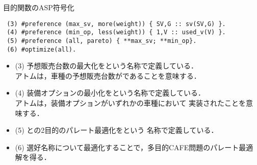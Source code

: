 \documentclass[dvipdfmx, 11pt]{beamer}
\begin{document}
\begin{frame}[fragile]{目的関数のASP符号化}
\begin{exampleblock}{}\small
\begin{lstlisting}
 (3) #preference (max_sv, more(weight)) { SV,G :: sv(SV,G) }.
 (4) #preference (min_op, less(weight)) { 1,V :: used_v(V) }.
 (5) #preference (all, pareto) { **max_sv; **min_op}.
 (6) #optimize(all). 
\end{lstlisting}
\end{exampleblock}
\begin{itemize}
 \item (3) 予想販売台数の最大化をという名称で定義している．\\
       アトムは，車種の予想販売台数がであることを意味する． 
 \item (4) 装備オプションの最小化をという名称で定義している．\\
       アトムは，装備オプションがいずれかの車種において
       実装されたことを意味する．
 \item (5) との2目的のパレート最適化をという
       名称で定義している．
 \item (6) 選好名称について最適化することで，多目的CAFE問題のパレート最適解を得る．
\end{itemize}
\end{frame}
\end{document}
